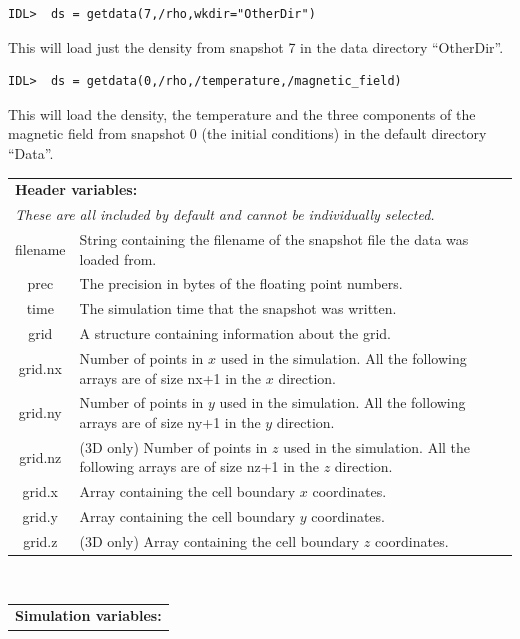 \documentclass[11pt]{article}
\begin{document}
\begin{verbatim}
IDL>  ds = getdata(7,/rho,wkdir="OtherDir")
\end{verbatim}
This will load just the density from snapshot 7 in the data directory ``OtherDir''.

\begin{verbatim}
IDL>  ds = getdata(0,/rho,/temperature,/magnetic_field)
\end{verbatim}
This will load the density, the temperature and the three components of the magnetic field from snapshot 0 (the initial conditions) in the default directory ``Data''.

\begin{table}[!htbp]
\begin{center}
\begin{tabular}{|c|p{}|}
\multicolumn{2}{l}{{\bf Header variables:}}\\
\multicolumn{2}{l}{{\em These are all included by default and cannot be individually selected.}}\\
\hline
filename& String containing the filename of the snapshot file the data was loaded from.\\
prec& The precision in bytes of the floating point numbers.\\
time& The simulation time that the snapshot was written.\\
grid& A structure containing information about the grid.\\
grid.nx&Number of points in $x$ used in the simulation. All the following arrays are of size nx+1 in the $x$ direction.\\
grid.ny&Number of points in $y$ used in the simulation. All the following arrays are of size ny+1 in the $y$ direction.\\
grid.nz& (3D only) Number of points in $z$ used in the simulation. All the following arrays are of size nz+1 in the $z$ direction.\\
grid.x& Array containing the cell boundary $x$ coordinates.\\
grid.y& Array containing the cell boundary $y$ coordinates.\\
grid.z& (3D only) Array containing the cell boundary $z$ coordinates.\\
\hline
\end{tabular}
\vspace{0.5cm}\\
\begin{tabular}{|c|p{}|}
\multicolumn{2}{l}{{\bf Simulation variables:}}\\

\end{tabular}
\end{center}
\end{table}
\end{document}
